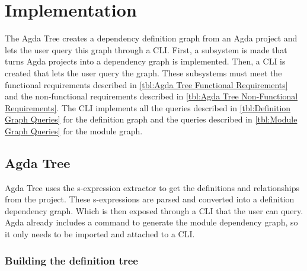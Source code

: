 
\chapter{Implementation} \label{ch:implementation}

The Agda Tree creates a dependency definition graph from an Agda project and
lets the user query this graph through a CLI. First, a subsystem  is made that
turns Agda projects into a dependency graph is implemented. Then, a CLI is
created that lets the user query the graph. These subsystems must meet the
functional requirements described in \cref{tbl:Agda Tree Functional
Requirements} and the non-functional requirements described in \cref{tbl:Agda
Tree Non-Functional Requirements}. The CLI implements all the queries described
in \cref{tbl:Definition Graph Queries} for the definition graph and the queries
described in \cref{tbl:Module Graph Queries} for the module graph.





\section{Agda Tree}

Agda Tree uses the s-expression extractor \cite{andrej} to get the definitions
and relationships from the project. These s-expressions are parsed and
converted into a definition dependency graph. Which is then exposed through a
CLI that the user can query. Agda already includes a command to generate the
module dependency graph, so it only needs to be imported and attached to a CLI.

\subsection{Building the definition tree}

